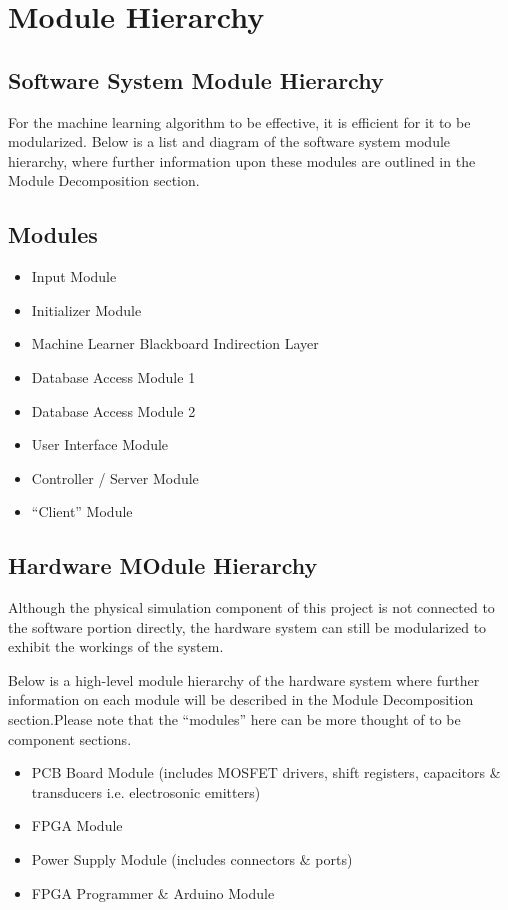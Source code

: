 \documentclass[12pt, titlepage]{article}
\begin{document}
\section{Module Hierarchy}
\subsection{Software System Module Hierarchy}
For the machine learning algorithm to be effective, it is efficient for it to be modularized. Below is a list and diagram of the software system module hierarchy, where further information upon these modules are outlined in the Module Decomposition section.

\subsection{Modules}
\begin{itemize}
  \item Input Module
  \item Initializer Module
  \item Machine Learner Blackboard Indirection Layer
  \item Database Access Module 1
  \item Database Access Module 2
  \item User Interface Module
  \item Controller / Server Module
  \item “Client” Module
\end{itemize}

\subsection{Hardware MOdule Hierarchy}
Although the physical simulation component of this project is not connected to the software portion directly, the hardware system can still be modularized to exhibit the workings of the system.
\par 
Below is a high-level module hierarchy of the hardware system where further information on each module will be described in the Module Decomposition section.Please note that the “modules” here can be more thought of to be component sections.
\par

\begin{itemize}
  \item PCB Board Module (includes MOSFET drivers, shift registers,  capacitors \& transducers i.e. electrosonic emitters)
  \item FPGA Module
  \item Power Supply Module (includes connectors \& ports)
  \item FPGA Programmer \& Arduino Module
\end{itemize}
\end{document}
